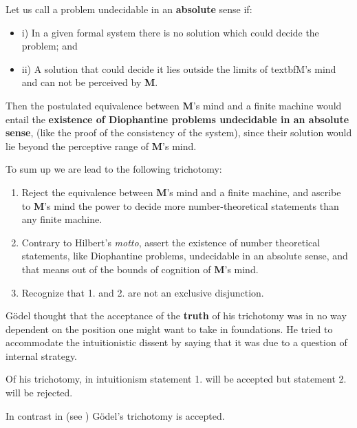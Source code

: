 \documentclass[12pt]{article}
\begin{document}
Let us call a problem undecidable in an \textbf{absolute} sense if:

\begin{itemize}
\item {i)} In a given formal system there is no solution which could decide the problem; and

\item {ii)} A solution that could decide it lies outside the limits of textbf{M}'s mind and can not be perceived by \textbf{M}.
\end{itemize}

Then the postulated equivalence between \textbf{M}'s mind and a finite machine would entail the \textbf{existence of Diophantine problems undecidable in an absolute sense}, (like the proof of the consistency of the system), since their solution would lie beyond the perceptive range of \textbf{M}'s mind.
 
To sum up we are lead to the following trichotomy:

\begin{enumerate}
\item Reject the equivalence between \textbf{M}'s mind and a finite machine, and ascribe to \textbf{M}'s mind the power to decide more number-theoretical statements than any finite machine.

\item Contrary to Hilbert's \emph{motto}, assert the existence of number theoretical statements, like Diophantine problems, undecidable in an absolute sense, and that means out of the bounds of cognition of \textbf{M}'s mind.

\item Recognize that 1. and 2. are not an exclusive disjunction. 
\end{enumerate}

G\"{o}del thought that the acceptance of the \textbf{truth} of his trichotomy was in no way dependent on the position one might want to take in foundations. He tried to accommodate the intuitionistic dissent by saying that it was due to a question of internal strategy.

Of his trichotomy, in intuitionism statement 1. will be accepted but statement 2. will be rejected.

In contrast in  (see \cite {SF}) G\"{o}del's trichotomy is accepted.
\end{document}
